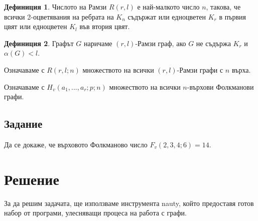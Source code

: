 \documentclass[letterpaper,12pt]{article}
\theoremstyle{definition}
\newtheorem{definition}{Дефиниция}[section]
\begin{document}
\begin{definition}
Числото на Рамзи $R(r, l)$ е най-малкото число $n$, такова, че всички 2-оцветявания на ребрата на $K_n$ съдържат или едноцветен $K_r$ в първия цвят или едноцветен $K_l$ във втория цвят.
\end{definition}

\begin{definition}
Графът $G$ наричаме $(r, l)$-Рамзи граф, ако $G$ не съдържа $K_{r}$ и $\alpha(G) < l$.
\end{definition}

\begin{signify}
Означаваме с $R(r, l; n)$ множеството на всички $(r,l)$-Рамзи графи с $n$ върха.
\end{signify}

\begin{signify}
Означаваме с $H_v(a_1,...,a_r;p;n)$ множеството на всички $n$-върхови Фолкманови графи.
\end{signify}

\subsection{Задание}

Да се докаже, че върховото Фолкманово число $F_v(2, 3, 4; 6) = 14$.

\section{Решение}

За да решим задачата, ще използваме инструмента nauty, който предоставя готов набор от програми, улесняващи процеса на работа с графи.
\end{document}
